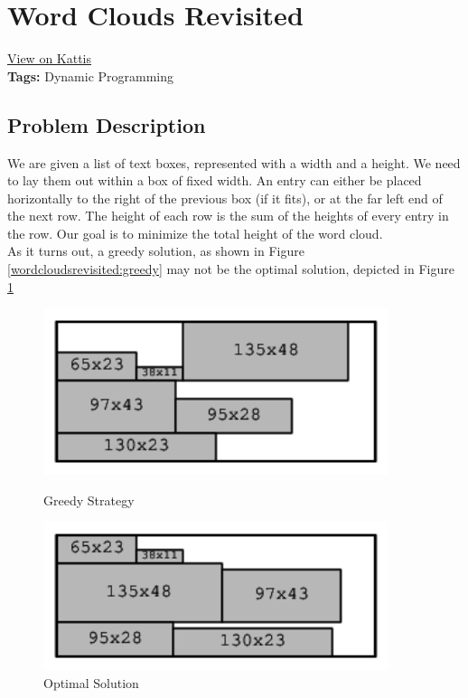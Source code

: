 \section{Word Clouds Revisited}
\label{wordcloudsrevisited}
\href{https://open.kattis.com/problems/wordclouds}{View on Kattis}\\
\textbf{Tags:} Dynamic Programming\\
\subsection{Problem Description}
We are given a list of text boxes, represented with a width and a height. We
need to lay them out within a box of fixed width. An entry can either be placed
horizontally to the right of the previous box (if it fits), or at the far left
end of the next row. The height of each row is the sum of the heights of every
entry in the row. Our goal is to minimize the total height of the word cloud.\\

As it turns out, a greedy solution, as shown in Figure
\ref{wordcloudsrevisited:greedy} may not be the optimal solution, depicted in
Figure \ref{wordcloudsrevisited:optimal}

\begin{figure}[h!]
  \centering
  \begin{minipage}{0.45\textwidth}
    \centering
    \includegraphics[width=0.9\textwidth]{Images/wordcloudsrevisited-greedy.png}
    \caption{Greedy Strategy}
    \label{wordcloudsrevisited:greedy}
  \end{minipage}
  \hfill
  \begin{minipage}{0.45\textwidth}
    \centering
    \includegraphics[width=0.9\textwidth]{Images/wordcloudsrevisited-optimal.png}
    \caption{Optimal Solution}
    \label{wordcloudsrevisited:optimal}
  \end{minipage}
\end{figure}

